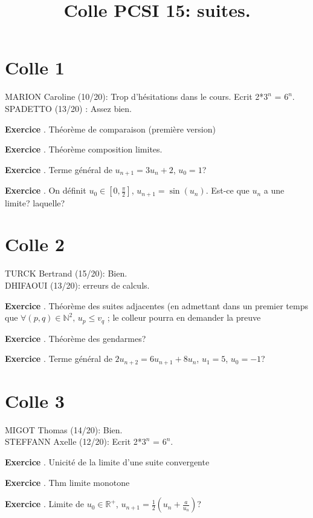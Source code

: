 \documentclass[10pt,a4paper]{article}
\title{Colle PCSI 15: suites.}
\newcounter{question}
\newcounter{exo}
\newenvironment{exo}{\vspace{0.5cm}\setcounter{question}{0}\addtocounter{exo}{1} \noindent \textbf{Exercice \theexo}. \normalsize }{\par}
\begin{document}
	\maketitle
	
	\section*{Colle 1}
	\setcounter{exo}{0}
	MARION Caroline (10/20): Trop d'hésitations dans le cours. Ecrit 2*$3^n$ = $6^n$.\\
	SPADETTO (13/20) : Assez bien.\\
	
	\begin{exo}
		Théorème de comparaison (première version)
	\end{exo}
	
	\begin{exo}
		Théorème composition limites.
	\end{exo}
	
	\begin{exo}
		Terme général de $u_{n+1} = 3 u_n + 2$, $u_0 = 1$?
	\end{exo}

	\begin{exo}
		On définit $u_0 \in [0, \frac{\pi}{2}]$, $u_{n+1} = \sin(u_n)$. Est-ce que $u_n$ a une limite? laquelle?
	\end{exo}
	
	\section*{Colle 2}
	\setcounter{exo}{0}
	TURCK Bertrand (15/20): Bien.\\
	DHIFAOUI (13/20): erreurs de calculs.\\
	
	\begin{exo}
		Théorème des suites adjacentes (en admettant dans un premier temps que $\forall (p, q) \in \mathbb{N}^2, \, u_p \leq v_q$ ; le colleur pourra en demander la preuve
	\end{exo}

	\begin{exo}
		Théorème des gendarmes?
	\end{exo}

	\begin{exo}
		Terme général de $2u_{n+2} = 6 u_{n+1} + 8 u_n$, $u_1 = 5$, $u_0 = -1$?
	\end{exo}
		
	
	\section*{Colle 3}
	\setcounter{exo}{0}
	MIGOT Thomas (14/20): Bien.\\
	STEFFANN Axelle (12/20): Ecrit 2*$3^n$ = $6^n$.\\
	
	\begin{exo}
		Unicité de la limite d'une suite convergente
	\end{exo}
	
	\begin{exo}
		Thm limite monotone
	\end{exo}	
	
	\begin{exo}
		Limite de $u_0 \in \mathbb{R}^+$, $u_{n+1} = \frac{1}{2} (u_n +\frac{a}{u_n})$?
	\end{exo}
	
\end{document}
